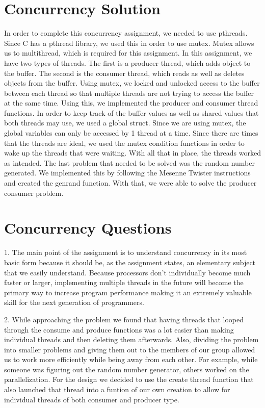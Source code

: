 \documentclass[draftclsnofoot,onecolumn,10pt]{article}
\begin{document}
    \section{Concurrency Solution}
        \begin{flushleft}
        In order to complete this concurrency assignment, we needed to use pthreads. Since C has a pthread library, we used this in order to use mutex. Mutex allows us  to multithread, which is required for this assignment. In this assignment, we have two types of threads. The first is a producer thread, which adds object to the buffer. The second is the consumer thread, which reads as well as deletes objects from the buffer. Using mutex, we locked and unlocked access to the buffer between each thread so that multiple threads are not trying to access the buffer at the same time. Using this, we implemented the producer and consumer thread functions. In order to keep track of the buffer values as well as shared values that both threads may use, we used a global struct. Since we are using mutex, the global variables can only be accessed by 1 thread at a time. Since there are times that the threads are ideal, we used the mutex condition functions in order to wake up the threads that were waiting. With all that in place, the threads worked as intended. The last problem that needed to be solved was the random number generated. We implemented this by following the Mesenne Twister instructions and created the genrand function. With that, we were able to solve the producer consumer problem.
        \end{flushleft}
        
    \section{Concurrency Questions}
        \begin{flushleft}
        1. The main point of the assignment is to understand concurrency in its most basic form because it should be, as the assignment states, an elementary subject that we easily understand. Because processors don’t individually become much faster or larger, implementing multiple threads in the future will become the primary way to increase program performance making it an extremely valuable skill for the next generation of programmers.
        \end{flushleft}
        
        \begin{flushleft}
    	2. While approaching the problem we found that having threads that looped through the consume and produce functions was a lot easier than making individual threads and then deleting them afterwards. Also, dividing the problem into smaller problems and giving them out to the members of our group allowed us to work more efficiently while being away from each other. For example, while someone was figuring out the random number generator, others worked on the parallelization. For the design we decided to use the create thread function that also launched that thread into a funtion of our own creation to allow for individual threads of both consumer and producer type.
    	\end{flushleft}
	
\end{document}
